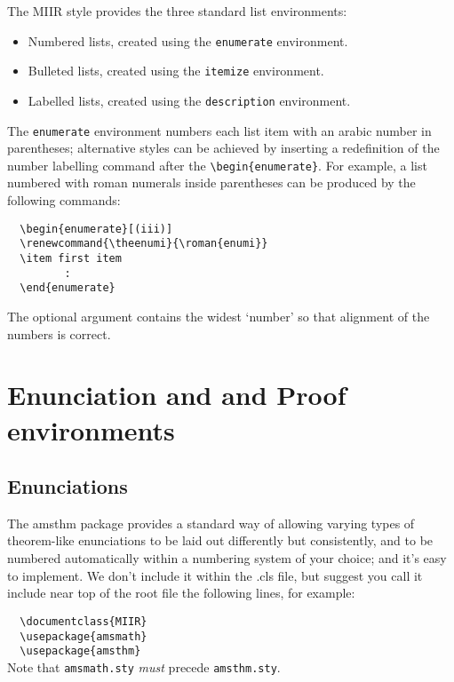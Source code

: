 \documentclass{MIIR}
\theoremstyle{plain}
\theoremstyle{definition}
\begin{document}
The MIIR style provides the three standard list environments:
\begin{itemize}
  \item Numbered lists, created using the \verb"enumerate" environment.
  \item Bulleted lists, created using the \verb"itemize" environment.
  \item Labelled lists, created using the \verb"description" environment.
\end{itemize}
The \verb"enumerate" environment numbers each list item with an arabic
number in parentheses; alternative styles can be achieved by inserting
a redefinition of the number labelling command after the
\verb"\begin{enumerate}". For example, a list numbered with roman numerals
inside parentheses can be produced by the following commands:
%
\begin{verbatim}
  \begin{enumerate}[(iii)]
  \renewcommand{\theenumi}{\roman{enumi}}
  \item first item
         :
  \end{enumerate}
\end{verbatim}
The optional argument contains the widest `number' so that alignment of the numbers is correct. 


\section{Enunciation and and Proof environments}\label{sectTheor}

\subsection{Enunciations}

The amsthm package provides a standard way of allowing varying types of theorem-like enunciations to
be laid out differently but consistently, and to be numbered automatically within
a numbering system of your choice; and it's easy to implement. We don't include it within the .cls file, but
suggest you call it
include near top of the root file the following lines, for example:

\verb"  \documentclass{"\texttt{MIIR}\verb"}"\\
\verb"  \usepackage{amsmath}"\\
\verb"  \usepackage{amsthm}"\\[0.5\baselineskip]
Note that \verb"amsmath.sty" \emph{must} precede \verb"amsthm.sty".
\end{document}
